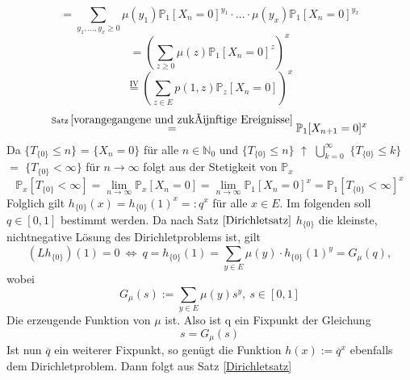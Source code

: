\begin{equation*}
= \sum_{y_{1},...,y_{x} \geq 0 } \mu(y_{1}) \mathbb{P}_{1}[X_{n} = 0]^{y_{1}} \cdot...\cdot \mu(y_{x}) \mathbb{P}_{1}[X_{n} = 0]^{y_{x}}
\end{equation*}
\begin{equation*}
= (\sum_{z \geq 0} \mu(z) \mathbb{P}_{1}[X_{n} = 0]^{z})^{x}
\end{equation*}
\begin{equation*}
\stackrel{\mathrm{IV}}{=} (\sum_{z \in E} p(1,z) \mathbb{P}_{z}[X_{n} = 0])^{x}
\end{equation*}
\begin{equation*}
\stackrel{\mathrm{Satz} \: \ref{vorangegangene und zukünftige Ereignisse}}{=}   \mathbb{P}_{1}[X_{n+1} = 0]^{x}
\end{equation*}
Da $\lbrace T_{\lbrace 0 \rbrace} \leq n \rbrace$ = $\lbrace X_{n} = 0 \rbrace$ für alle $n \in \mathbb{N}_{0}$ und $\lbrace T_{\lbrace 0 \rbrace}  \leq n \rbrace$ $\uparrow$ $\bigcup_{k=0}^{\infty}$ $\lbrace T_{\lbrace 0 \rbrace} \leq k \rbrace$ $=$ $\lbrace T_{\lbrace 0 \rbrace} < \infty \rbrace$ für $n \to \infty$ folgt aus der Stetigkeit von $\mathbb{P}_{x}$
\begin{equation*}
\mathbb{P}_{x}[T_{\lbrace 0 \rbrace} < \infty] = \lim_{n \to \infty} \mathbb{P}_{x}[X_{n} = 0] = \lim_{n \to \infty} \mathbb{P}_{1}[X_{n} = 0]^{x} = \mathbb{P}_{1}[T_{\lbrace 0 \rbrace} < \infty]^{x}
\end{equation*}
Folglich gilt $h_{\lbrace 0 \rbrace}(x) = h_{\lbrace 0 \rbrace}(1)^{x} =: q^{x}$ für alle $x \in E$. Im folgenden soll $q \in [0,1]$ bestimmt werden. Da nach Satz $\ref{Dirichletsatz}$ $h_{\lbrace 0 \rbrace}$ die kleinste, nichtnegative Lösung des Dirichletproblems ist, gilt
\begin{equation*}
(Lh_{\lbrace 0 \rbrace})(1) = 0 \: \Leftrightarrow \: q = h_{\lbrace 0 \rbrace}(1) = \sum_{y \in E} \mu(y) \cdot  h_{\lbrace 0 \rbrace}(1)^{y} = G_{\mu}(q),
\end{equation*} 
wobei
\begin{equation*}
G_{\mu}(s) := \sum_{y \in E} \mu(y) s^{y}, \: s \in [0,1]
\end{equation*}
Die erzeugende Funktion von $\mu$ ist. Also ist q ein Fixpunkt der Gleichung
\begin{equation*}
s = G_{\mu}(s)
\end{equation*}
Ist nun $\overline{q}$ ein weiterer Fixpunkt, so genügt die Funktion $h(x) := \overline{q}^{x}$ ebenfalls dem Dirichletproblem. Dann folgt aus Satz \ref{Dirichletsatz}
